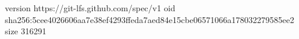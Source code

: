 version https://git-lfs.github.com/spec/v1
oid sha256:5cee4026606aa7e38ef4293ffeda7aed84e15cbe06571066a178032279585ee2
size 316291
